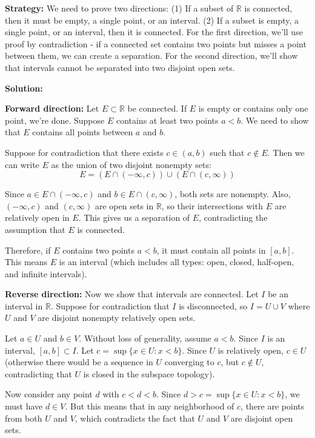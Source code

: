 \noindent\textbf{Strategy:} We need to prove two directions: (1) If a subset of $\mathbb{R}$ is connected, then it must be empty, a single point, or an interval. (2) If a subset is empty, a single point, or an interval, then it is connected. For the first direction, we'll use proof by contradiction - if a connected set contains two points but misses a point between them, we can create a separation. For the second direction, we'll show that intervals cannot be separated into two disjoint open sets.

\bigskip\noindent\textbf{Solution:}

\textbf{Forward direction:} Let $E \subset \mathbb{R}$ be connected. If $E$ is empty or contains only one point, we're done. Suppose $E$ contains at least two points $a < b$. We need to show that $E$ contains all points between $a$ and $b$.

Suppose for contradiction that there exists $c \in (a,b)$ such that $c \notin E$. Then we can write $E$ as the union of two disjoint nonempty sets:
\[E = (E \cap (-\infty, c)) \cup (E \cap (c, \infty))\]

Since $a \in E \cap (-\infty, c)$ and $b \in E \cap (c, \infty)$, both sets are nonempty. Also, $(-\infty, c)$ and $(c, \infty)$ are open sets in $\mathbb{R}$, so their intersections with $E$ are relatively open in $E$. This gives us a separation of $E$, contradicting the assumption that $E$ is connected.

Therefore, if $E$ contains two points $a < b$, it must contain all points in $[a,b]$. This means $E$ is an interval (which includes all types: open, closed, half-open, and infinite intervals).

\textbf{Reverse direction:} Now we show that intervals are connected. Let $I$ be an interval in $\mathbb{R}$. Suppose for contradiction that $I$ is disconnected, so $I = U \cup V$ where $U$ and $V$ are disjoint nonempty relatively open sets.

Let $a \in U$ and $b \in V$. Without loss of generality, assume $a < b$. Since $I$ is an interval, $[a,b] \subset I$. Let $c = \sup\{x \in U : x < b\}$. Since $U$ is relatively open, $c \in U$ (otherwise there would be a sequence in $U$ converging to $c$, but $c \notin U$, contradicting that $U$ is closed in the subspace topology).

Now consider any point $d$ with $c < d < b$. Since $d > c = \sup\{x \in U : x < b\}$, we must have $d \in V$. But this means that in any neighborhood of $c$, there are points from both $U$ and $V$, which contradicts the fact that $U$ and $V$ are disjoint open sets.

